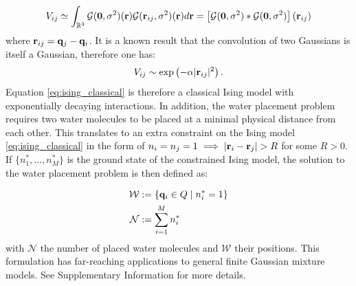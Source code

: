 \documentclass[fleqn,10pt]{wlscirep}
\begin{document}
\begin{equation}
    V_{ij} \simeq \int_{\mathbb{R}^3} \mathcal{G}(\vb{0},\sigma^2)(\vb{r}) \mathcal{G}(\vb{r}_{ij},\sigma^2)(\vb{r}) d\vb{r} = \left[\mathcal{G}(\vb{0},\sigma^2) * \mathcal{G}(\vb{0},\sigma^2)\right] (\vb{r}_{ij})
\end{equation}
where $\vb{r}_{ij} = \vb{q}_j - \vb{q}_i$. It is a known result that the convolution of two Gaussians is itself a Gaussian, therefore one has:
\begin{equation}
    V_{ij} \sim \exp\left(-\alpha |\vb{r}_{ij}|^2\right).
\end{equation}
Equation \eqref{eq:ising_classical} is therefore a classical Ising model with exponentially decaying interactions. In addition, the water placement problem requires two water molecules to be placed at a minimal physical distance from each other. This translates to an extra constraint on the Ising model \eqref{eq:ising_classical} in the form of $n_i = n_j = 1 \implies |\vb{r}_i - \vb{r}_j| > R$ for some $R>0$. If $\{n_1^*, \ldots, n_M^*\}$ is the ground state of the constrained Ising model, the solution to the water placement problem is then defined as: 

\begin{align}
\mathcal{W} &:= \{\vb{q}_i \in Q \mid n_i^* = 1 \} \\
\mathcal{N} &:= \sum_{i=1}^M n_i^*
\end{align}
with $\mathcal{N}$ the number of placed water molecules and $\mathcal{W}$ their positions. This formulation has far-reaching applications to general finite Gaussian mixture models. See Supplementary Information for more details.
\end{document}
